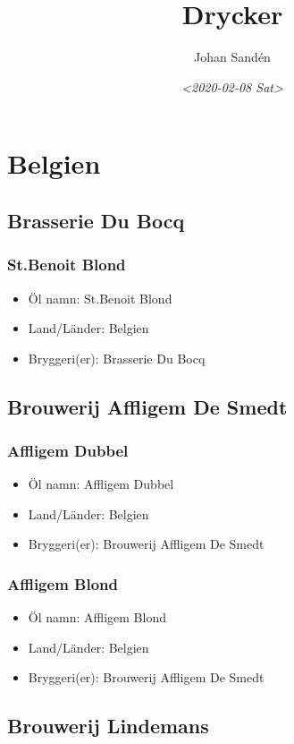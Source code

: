 \documentclass[11pt]{article}
\author{Johan Sandén}
\date{\textit{<2020-02-08 Sat>}}
\title{Drycker}
\begin{document}
\maketitle
\tableofcontents

\section{Belgien}
\label{sec:org9db0187}
\subsection{Brasserie Du Bocq}
\label{sec:orgefa96f8}
\subsubsection{St.Benoit Blond}
\label{sec:orgffa5e2a}
\begin{itemize}
\item Öl namn: St.Benoit Blond
\item Land/Länder: Belgien
\item Bryggeri(er): Brasserie Du Bocq
\end{itemize}
\subsection{Brouwerij Affligem De Smedt}
\label{sec:org4c3b7f1}
\subsubsection{Affligem Dubbel}
\label{sec:org1911be8}
\begin{itemize}
\item Öl namn: Affligem Dubbel
\item Land/Länder: Belgien
\item Bryggeri(er): Brouwerij Affligem De Smedt
\end{itemize}
\subsubsection{Affligem Blond}
\label{sec:org50014a5}
\begin{itemize}
\item Öl namn: Affligem Blond
\item Land/Länder: Belgien
\item Bryggeri(er): Brouwerij Affligem De Smedt
\end{itemize}
\subsection{Brouwerij Lindemans}
\label{sec:org26eef3b}
\end{document}
